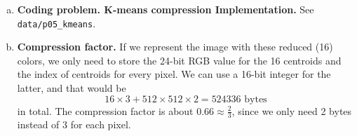 \documentclass[12pt,letterpaper,boxed]{hmcpset}
\begin{document}
\begin{solution}
  \begin{enumerate}[(a)]
    \item \textbf{Coding problem. K-means compression Implementation.} See \verb|data/p05_kmeans|.
    
    \item \textbf{Compression factor.} If we represent the image with these reduced (16) colors, we only need to store the 24-bit RGB value for the 16 centroids and the index of centroids for every pixel. We can use a 16-bit integer for the latter, and that would be
    \[
    16 \times 3 + 512 \times 512 \times 2 = 524336 \text{ bytes}
    \]
    in total. The compression factor is about $0.66 \approx \frac{2}{3}$, since we only need 2 bytes instead of 3 for each pixel.
  \end{enumerate}
\end{solution}
\end{document}
